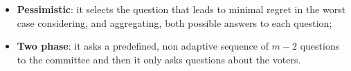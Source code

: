 \documentclass[blockverticalspace=3cm]{tikzposter}
\begin{document}
\begin{columns}
{\begin{itemize}
					\item \textbf{Pessimistic}: it selects the question that leads to minimal regret in the worst case considering, and aggregating, both possible answers to each question; 
					
					\item \textbf{Two phase}: it asks a predefined, non adaptive sequence of $m-2$ questions to the committee and then it only asks questions about the voters.
				\end{itemize}
			}
			 
			
			
		

\end{columns}
\end{document}
